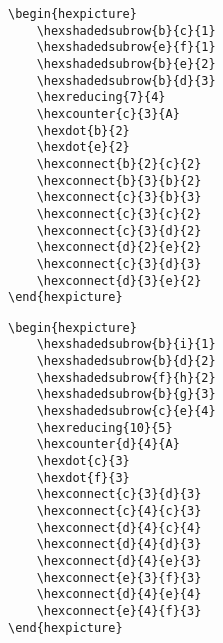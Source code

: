 \documentclass[a4paper,12pt]{article}
\begin{document}
    \begin{hexpicture}
    \end{hexpicture}


    \begin{verbatim}\begin{hexpicture}
    \hexshadedsubrow{b}{c}{1}
    \hexshadedsubrow{e}{f}{1}
    \hexshadedsubrow{b}{e}{2}
    \hexshadedsubrow{b}{d}{3}
    \hexreducing{7}{4}
    \hexcounter{c}{3}{A}
    \hexdot{b}{2}
    \hexdot{e}{2}
    \hexconnect{b}{2}{c}{2}
    \hexconnect{b}{3}{b}{2}
    \hexconnect{c}{3}{b}{3}
    \hexconnect{c}{3}{c}{2}
    \hexconnect{c}{3}{d}{2}
    \hexconnect{d}{2}{e}{2}
    \hexconnect{c}{3}{d}{3}
    \hexconnect{d}{3}{e}{2}
\end{hexpicture}\end{verbatim}

	\begin{hexpicture}
    \end{hexpicture}

    \begin{verbatim}\begin{hexpicture}
    \hexshadedsubrow{b}{i}{1}
    \hexshadedsubrow{b}{d}{2}
    \hexshadedsubrow{f}{h}{2}
    \hexshadedsubrow{b}{g}{3}
    \hexshadedsubrow{c}{e}{4}
    \hexreducing{10}{5}
    \hexcounter{d}{4}{A}
    \hexdot{c}{3}
    \hexdot{f}{3}
    \hexconnect{c}{3}{d}{3}
    \hexconnect{c}{4}{c}{3}
    \hexconnect{d}{4}{c}{4}
    \hexconnect{d}{4}{d}{3}
    \hexconnect{d}{4}{e}{3}
    \hexconnect{e}{3}{f}{3}
    \hexconnect{d}{4}{e}{4}
    \hexconnect{e}{4}{f}{3}
\end{hexpicture}\end{verbatim}
\end{document}
